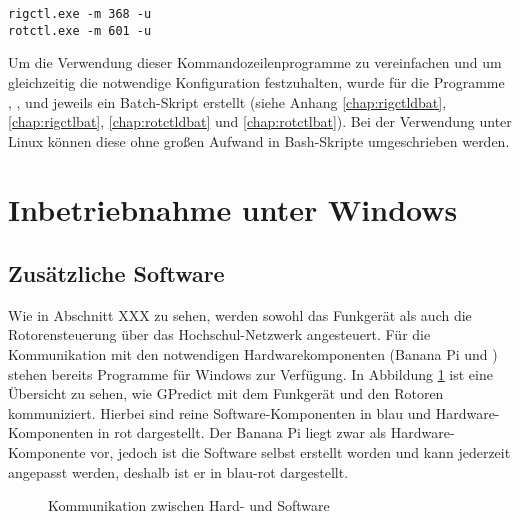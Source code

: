 \vspace{-1em}
\begin{shaded}
	\texttt{rigctl.exe -m 368 -u}\\
	\texttt{rotctl.exe -m 601 -u}
\end{shaded}
\vspace{-1em}

Um die Verwendung dieser Kommandozeilenprogramme zu vereinfachen und um gleichzeitig die notwendige Konfiguration festzuhalten, wurde für die Programme , ,  und  jeweils ein Batch-Skript erstellt (siehe Anhang \ref{chap:rigctldbat}, \ref{chap:rigctlbat}, \ref{chap:rotctldbat} und \ref{chap:rotctlbat}). Bei der Verwendung unter Linux können diese ohne großen Aufwand in Bash-Skripte umgeschrieben werden. 

\clearpage

\section{Inbetriebnahme unter Windows}

\subsection{Zusätzliche Software}
\label{chap:software}

Wie in Abschnitt XXX zu sehen, werden sowohl das Funkgerät als auch die Rotorensteuerung über das Hochschul-Netzwerk angesteuert. Für die Kommunikation mit den notwendigen Hardwarekomponenten (Banana Pi und ) stehen bereits Programme für Windows zur Verfügung. In Abbildung \ref{fig:swhwcom} ist eine Übersicht zu sehen, wie GPredict mit dem Funkgerät und den Rotoren kommuniziert. Hierbei sind reine Software-Komponenten in blau und Hardware-Komponenten in rot dargestellt. Der Banana Pi liegt zwar als Hardware-Komponente vor, jedoch ist die Software selbst erstellt worden und kann jederzeit angepasst werden, deshalb ist er in blau-rot dargestellt.

\begin{figure}[h]
	\centering
	
	\caption{Kommunikation zwischen Hard- und Software}
	\label{fig:swhwcom} 
\end{figure}

